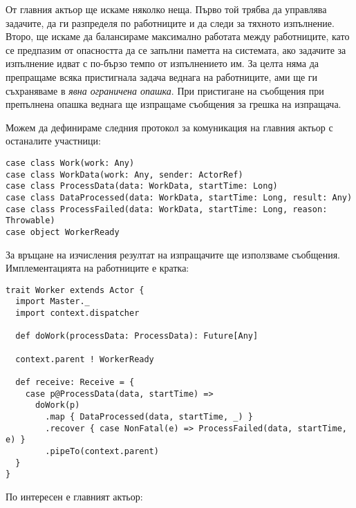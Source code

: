 От главния актьор ще искаме няколко неща. Първо той трябва да управлява задачите, да ги разпределя по работниците и да следи за тяхното изпълнение. Второ, ще искаме да балансираме максимално работата между работниците, като се предпазим от опасността да се запълни паметта на системата, ако задачите за изпълнение идват с по-бързо темпо от изпълнението им. За целта няма да препращаме всяка пристигнала задача веднага на работниците, ами ще ги съхраняваме в \emph{явна ограничена опашка}. При пристигане на съобщения при препълнена опашка веднага ще изпращаме съобщения за грешка на изпращача.

Можем да дефинираме следния протокол за комуникация на главния актьор с останалите участници:

\begin{lstlisting}
case class Work(work: Any)
case class WorkData(work: Any, sender: ActorRef)
case class ProcessData(data: WorkData, startTime: Long)
case class DataProcessed(data: WorkData, startTime: Long, result: Any)
case class ProcessFailed(data: WorkData, startTime: Long, reason: Throwable)
case object WorkerReady
\end{lstlisting}

За връщане на изчисления резултат на изпращачите ще използваме  съобщения. Имплементацията на работниците е кратка:

\begin{lstlisting}
trait Worker extends Actor {
  import Master._
  import context.dispatcher
  
  def doWork(processData: ProcessData): Future[Any]
  
  context.parent ! WorkerReady
  
  def receive: Receive = {
    case p@ProcessData(data, startTime) =>
      doWork(p)
        .map { DataProcessed(data, startTime, _) }
        .recover { case NonFatal(e) => ProcessFailed(data, startTime, e) }
        .pipeTo(context.parent)
  }
}
\end{lstlisting}

По интересен е главният актьор:


